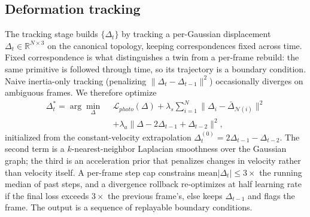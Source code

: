 \documentclass[review]{elsarticle}
\begin{document}
\subsection{Deformation tracking}
\label{sec:tier2}
The tracking stage builds $\{\Delta_t\}$ by tracking a per-Gaussian displacement
$\Delta_t \in \mathbb{R}^{N \times 3}$ on the canonical topology, keeping
correspondences fixed across time. Fixed correspondence is what
distinguishes a twin from a per-frame rebuild: the same primitive is
followed through time, so its trajectory is a boundary condition. Naive
inertia-only tracking (penalizing $\|\Delta_t - \Delta_{t-1}\|^2$)
occasionally diverges on ambiguous frames. We therefore optimize
\begin{align}
\Delta_t^* = \arg\min_{\Delta}\ \ & \mathcal{L}_{photo}(\Delta)
+ \lambda_s \sum_{i=1}^{N} \big\| \Delta_i - \bar{\Delta}_{\mathcal{N}(i)} \big\|^2 \nonumber\\
& + \lambda_a \big\| \Delta - 2\Delta_{t-1} + \Delta_{t-2} \big\|^2,
\label{eq:track}
\end{align}
initialized from the constant-velocity extrapolation
$\Delta_t^{(0)} = 2\Delta_{t-1} - \Delta_{t-2}$. The second term is a
$k$-nearest-neighbor Laplacian smoothness over the Gaussian graph; the
third is an acceleration prior that penalizes changes in velocity rather
than velocity itself. A per-frame step cap constrains
$\mathrm{mean}|\Delta_t| \le 3\times$ the running median of past steps, and
a divergence rollback re-optimizes at half learning rate if the final loss
exceeds $3\times$ the previous frame's, else keeps $\Delta_{t-1}$ and flags
the frame. The output is a sequence of replayable boundary conditions.
\end{document}
